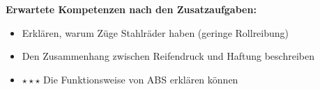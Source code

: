 \documentclass[11pt,a4paper]{article}
\newcommand{\stern}[1]{\textcolor{merkerand}{\textbf{#1}}}
\begin{document}
\vspace{0.4em}

\begin{merkkasten}
\textbf{Erwartete Kompetenzen nach den Zusatzaufgaben:}

\vspace{0.2em}
\small
\begin{itemize}[leftmargin=*, itemsep=2pt]
    \item Erklären, warum Züge Stahlräder haben (geringe Rollreibung)
    \item Den Zusammenhang zwischen Reifendruck und Haftung beschreiben
    \item \stern{$\star\star\star$} Die Funktionsweise von ABS erklären können
\end{itemize}
\end{merkkasten}
\end{document}
